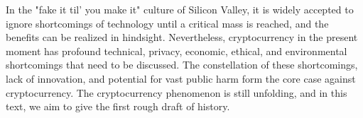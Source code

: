 In the "fake it til' you make it" culture of Silicon Valley, it is widely
accepted to ignore shortcomings of technology until a critical mass is reached,
and the benefits can be realized in hindsight.  Nevertheless, cryptocurrency in
the present moment has profound technical, privacy, economic, ethical, and
environmental shortcomings that need to be discussed. The constellation of these
shortcomings, lack of innovation, and potential for vast public harm form the
core case against cryptocurrency. The cryptocurrency phenomenon is still
unfolding, and in this text, we aim to give the first rough draft of history.

